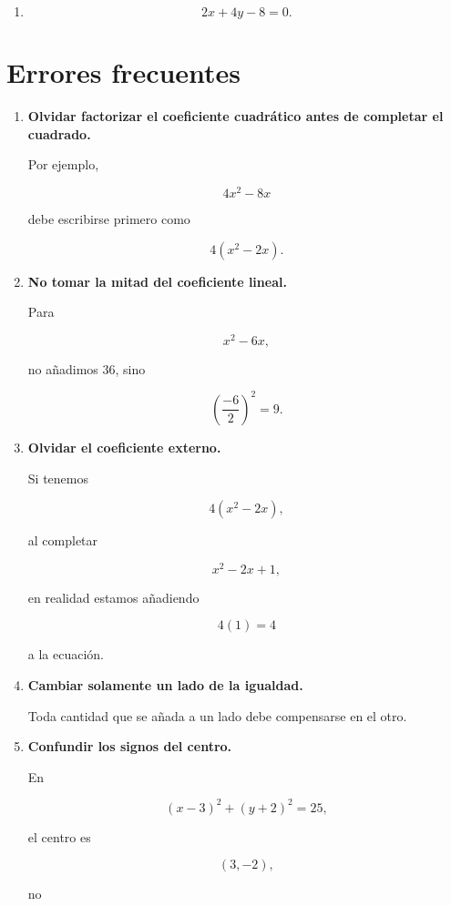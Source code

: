 \documentclass[12pt]{article}
\theoremstyle{plain}
\theoremstyle{definition}
\theoremstyle{remark}
\begin{document}
{\begin{enumerate}
\item
\[
2x+4y-8=0.
\]

\end{enumerate}

\section*{Errores frecuentes}

\begin{enumerate}

\item \textbf{Olvidar factorizar el coeficiente cuadrático antes de
completar el cuadrado.}

Por ejemplo,

\[
4x^2-8x
\]

debe escribirse primero como

\[
4(x^2-2x).
\]

\item \textbf{No tomar la mitad del coeficiente lineal.}

Para

\[
x^2-6x,
\]

no añadimos \(36\), sino

\[
\left(\frac{-6}{2}\right)^2=9.
\]

\item \textbf{Olvidar el coeficiente externo.}

Si tenemos

\[
4(x^2-2x),
\]

al completar

\[
x^2-2x+1,
\]

en realidad estamos añadiendo

\[
4(1)=4
\]

a la ecuación.

\item \textbf{Cambiar solamente un lado de la igualdad.}

Toda cantidad que se añada a un lado debe compensarse en el otro.

\item \textbf{Confundir los signos del centro.}

En

\[
(x-3)^2+(y+2)^2=25,
\]

el centro es

\[
(3,-2),
\]

no


\end{enumerate}}
\end{document}
